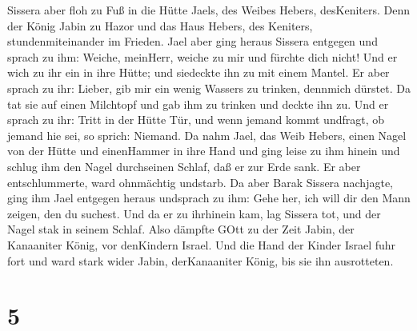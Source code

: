  Sissera aber floh zu Fuß in die Hütte Jaels, des Weibes
Hebers, desKeniters. Denn der König Jabin zu Hazor und das Haus Hebers,
des Keniters, stundenmiteinander im Frieden.  Jael aber
ging heraus Sissera entgegen und sprach zu ihm: Weiche, meinHerr, weiche
zu mir und fürchte dich nicht! Und er wich zu ihr ein in ihre Hütte; und
siedeckte ihn zu mit einem Mantel.  Er aber sprach zu ihr:
Lieber, gib mir ein wenig Wassers zu trinken, dennmich dürstet. Da tat
sie auf einen Milchtopf und gab ihm zu trinken und deckte ihn zu.
 Und er sprach zu ihr: Tritt in der Hütte Tür, und wenn
jemand kommt undfragt, ob jemand hie sei, so sprich: Niemand.
 Da nahm Jael, das Weib Hebers, einen Nagel von der Hütte
und einenHammer in ihre Hand und ging leise zu ihm hinein und schlug ihm
den Nagel durchseinen Schlaf, daß er zur Erde sank. Er aber
entschlummerte, ward ohnmächtig undstarb.  Da aber Barak
Sissera nachjagte, ging ihm Jael entgegen heraus undsprach zu ihm: Gehe
her, ich will dir den Mann zeigen, den du suchest. Und da er zu
ihrhinein kam, lag Sissera tot, und der Nagel stak in seinem Schlaf.
 Also dämpfte GOtt zu der Zeit Jabin, der Kanaaniter König,
vor denKindern Israel.  Und die Hand der Kinder Israel fuhr
fort und ward stark wider Jabin, derKanaaniter König, bis sie ihn
ausrotteten.

\hypertarget{section-4}{%
\section{5}\label{section-4}}

